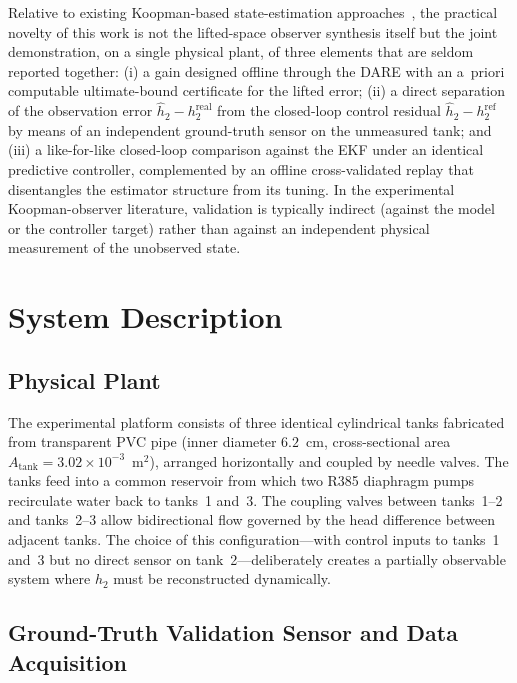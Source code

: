 \documentclass[asi,article,accept,pdftex,moreauthors]{Definitions/mdpi}
\newcommand{\rev}[1]{#1}%
\begin{document}
\rev{Relative to existing Koopman-based state-estimation approaches~\cite{surana2016,Surana2017,kiloekf2026}, the practical novelty of this work is not the lifted-space observer synthesis itself but the joint demonstration, on a single physical plant, of three elements that are seldom reported together: (i) a gain designed offline through the DARE with an a~priori computable ultimate-bound certificate for the lifted error; (ii) a direct separation of the observation error $\hat h_2-h_2^\mathrm{real}$ from the closed-loop control residual $\hat h_2-h_2^\mathrm{ref}$ by means of an independent ground-truth sensor on the unmeasured tank; and (iii) a like-for-like closed-loop comparison against the EKF under an identical predictive controller, complemented by an offline cross-validated replay that disentangles the estimator structure from its tuning. In the experimental Koopman-observer literature, validation is typically indirect (against the model or the controller target) rather than against an independent physical measurement of the unobserved state.}

\section{System Description}
\label{sec:system}

\subsection{Physical Plant}

The experimental platform consists of three identical cylindrical tanks fabricated
from transparent PVC pipe (inner diameter $6.2$~cm, cross-sectional area
$A_\mathrm{tank} = 3.02 \times 10^{-3}$~m$^2$), arranged horizontally and coupled
by needle valves. The tanks feed into a common reservoir from which two R385 diaphragm
pumps recirculate water back to tanks~1 and~3. The coupling valves between tanks~1--2 and tanks~2--3 allow bidirectional flow governed by the head difference between adjacent tanks. The choice of this configuration---with control inputs to tanks~1 and~3 but no direct sensor on tank~2---deliberately creates a partially observable system where $h_2$ must be reconstructed dynamically.

\subsection{Ground-Truth Validation Sensor and Data Acquisition}
\label{sec:ground_truth}
\end{document}
